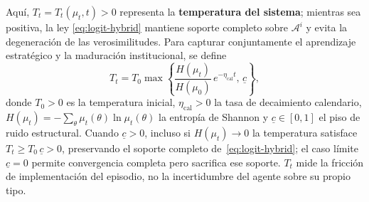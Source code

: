 \documentclass[12pt]{article}
\providecommand{\textcite}{\citet}
\theoremstyle{definition}
\theoremstyle{remark}
\newcommand{\1}{\mathbf{1}}
\begin{document}
Aquí, $T_t=T_t(\mu_t,t)>0$ representa la \textbf{temperatura del sistema}; mientras sea positiva, la ley \eqref{eq:logit-hybrid} mantiene soporte completo sobre $\mathcal{A}^i$ y evita la degeneración de las verosimilitudes. Para capturar conjuntamente el aprendizaje estratégico y la maduración institucional, se define
\begin{equation}
\label{eq:temperatura-piso}
T_t = T_0\max\!\left\{\frac{H(\mu_t)}{H(\mu_0)}\,e^{-\eta_{\mathrm{cal}}t},\,\underline{c}\right\},
\end{equation}
\noindent donde $T_0>0$ es la temperatura inicial, $\eta_{\mathrm{cal}}>0$ la tasa de decaimiento calendario, $H(\mu_t)=-\sum_{\theta}\mu_t(\theta)\ln\mu_t(\theta)$ la entropía de Shannon \textcite{Shannon1948} y $\underline{c}\in[0,1]$ el piso de ruido estructural. Cuando $\underline{c}>0$, incluso si $H(\mu_t)\to 0$ la temperatura satisface $T_t\ge T_0\,\underline{c}>0$, preservando el soporte completo de~\eqref{eq:logit-hybrid}; el caso límite $\underline{c}=0$ permite convergencia completa pero sacrifica ese soporte. $T_t$ mide la fricción de implementación del episodio, no la incertidumbre del agente sobre su propio tipo.
\end{document}
